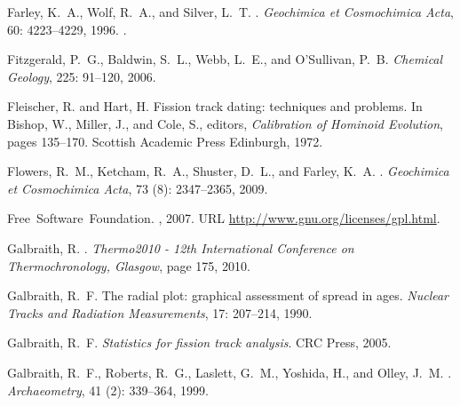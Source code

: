 \documentclass{article}
\begin{document}
\begin{thebibliography}{78}
{Farley}, K.~A., {Wolf}, R.~A., and {Silver}, L.~T.
.
\newblock \emph{Geochimica et Cosmochimica Acta}, 60: 4223--4229,
  1996.
\newblock {}.

Fitzgerald, P.~G., Baldwin, S.~L., Webb, L.~E., and O'Sullivan, P.~B.
\newblock \emph{Chemical Geology}, 225: 91--120, 2006.

Fleischer, R. and Hart, H.
\newblock Fission track dating: techniques and problems.
\newblock In Bishop, W., Miller, J., and Cole, S., editors, \emph{{Calibration
  of Hominoid Evolution}}, pages 135--170. Scottish Academic Press Edinburgh,
  1972.

Flowers, R.~M., Ketcham, R.~A., Shuster, D.~L., and Farley, K.~A.
.
\newblock \emph{Geochimica et Cosmochimica Acta}, 73 (8):
  2347--2365, 2009.

{Free~Software~Foundation}.
, 2007.
\newblock URL \url{http://www.gnu.org/licenses/gpl.html}.

Galbraith, R.
.
\newblock \emph{{Thermo2010 - 12th International Conference on
  Thermochronology, Glasgow}}, page 175, 2010.

Galbraith, R.~F.
\newblock The radial plot: graphical assessment of spread in ages.
\newblock \emph{Nuclear Tracks and Radiation Measurements}, 17:
  207--214, 1990.

Galbraith, R.~F.
\newblock \emph{Statistics for fission track analysis}.
\newblock CRC Press, 2005.

Galbraith, R.~F., Roberts, R.~G., Laslett, G.~M., Yoshida, H., and Olley, J.~M.
.
\newblock \emph{Archaeometry}, 41 (2): 339--364, 1999.


\end{thebibliography}
\end{document}
